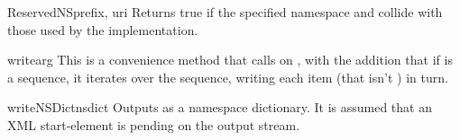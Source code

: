 \begin{methoddesc}{ReservedNS}{prefix, uri}
Returns true if the specified namespace  and
collide with those used by the implementation.
\end{methoddesc}

\begin{methoddesc}{write}{arg}
This is a convenience method that calls 
on , with the addition that if  is a sequence,
it iterates over the sequence, writing each item (that isn't )
in turn.
\end{methoddesc}

\begin{methoddesc}{writeNSDict}{nsdict}
Outputs  as a namespace dictionary.
It is assumed that an XML start-element is pending on the output
stream.
\end{methoddesc}

